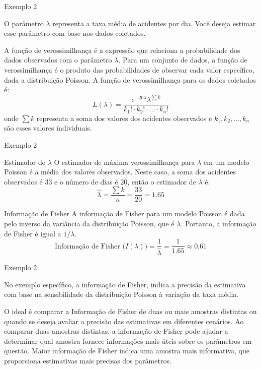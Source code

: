 \documentclass[12pt]{beamer}
\begin{document}
\begin{frame}{Exemplo 2}
\begin{block}{}
\justifying
O parâmetro $\lambda$ representa a taxa média de acidentes por dia. Você deseja estimar esse parâmetro com base nos dados coletados.
\end{block}
\pause
\begin{block}{}
\justifying
A função de verossimilhança é a expressão que relaciona a probabilidade dos dados observados com o parâmetro $\lambda$. Para um conjunto de dados, a função de verossimilhança é o produto das probabilidades de observar cada valor específico, dada a distribuição Poisson. A função de verossimilhança para os dados coletados é:
\[L(\lambda) = \frac{e^{-20\lambda} \lambda^{\sum{k}}}{k_1! \cdot k_2! \cdot \ldots \cdot k_n!}\]
onde $\sum{k}$ representa a soma dos valores dos acidentes observados e $k_1, k_2, \ldots, k_n$ são esses valores individuais.
\end{block}
\end{frame}

\begin{frame}{Exemplo 2}
\begin{block}{Estimador de $\lambda$}
\justifying
O estimador de máxima verossimilhança para $\lambda$ em um modelo Poisson é a média dos valores observados. Neste caso, a soma dos acidentes observados é $33$ e o número de dias é 20, então o estimador de $\lambda$ é:
\[\hat{\lambda} = \frac{\sum{k}}{n} = \frac{33}{20} = 1.65\]
\end{block}
\pause
\begin{block}{Informação de Fisher}
\justifying
A informação de Fisher para um modelo Poisson é dada pelo inverso da variância da distribuição Poisson, que é $\lambda$. Portanto, a informação de Fisher é igual a $1/\lambda$.
\[ \text{Informação de Fisher (} I(\lambda) \text{)} = \frac{1}{\hat{\lambda}} = \frac{1}{1.65} \approx 0.61 \]
\end{block}
\end{frame}

\begin{frame}{Exemplo 2}
\begin{block}{}
\justifying
No exemplo específico, a informação de Fisher, indica a precisão da estimativa com base na sensibilidade da distribuição Poisson à variação da taxa média.
\end{block}
\pause
\begin{block}{}
\justifying
O ideal é comparar a Informação de Fisher de duas ou mais amostras distintas ou quando se deseja avaliar a precisão das estimativas em diferentes cenários. Ao comparar duas amostras distintas, a informação de Fisher pode ajudar a determinar qual amostra fornece informações mais úteis sobre os parâmetros em questão. Maior informação de Fisher indica uma amostra mais informativa, que proporciona estimativas mais precisas dos parâmetros.
\end{block}
\end{frame}
\end{document}
